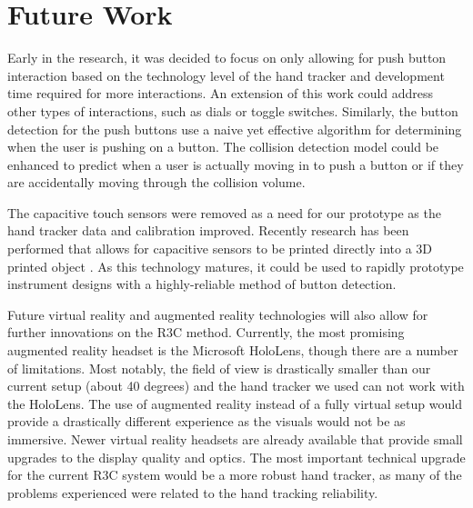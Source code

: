 \section{Future Work}

Early in the research, it was decided to focus on only allowing for push button interaction based on the technology level of the hand tracker and development time required for more interactions.
An extension of this work could address other types of interactions, such as dials or toggle switches.
Similarly, the button detection for the push buttons use a naive yet effective algorithm for determining when the user is pushing on a button.
The collision detection model could be enhanced to predict when a user is actually moving in to push a button or if they are accidentally moving through the collision volume.

The capacitive touch sensors were removed as a need for our prototype as the hand tracker data and calibration improved.
Recently research has been performed that allows for capacitive sensors to be printed directly into a 3D printed object \citep{shemelya_3d_2013,kwok_electrically_2017}.
As this technology matures, it could be used to rapidly prototype instrument designs with a highly-reliable method of button detection.

Future virtual reality and augmented reality technologies will also allow for further innovations on the R3C method.
Currently, the most promising augmented reality headset is the Microsoft HoloLens, though there are a number of limitations.
Most notably, the field of view is drastically smaller than our current setup (about 40 degrees) and the hand tracker we used can not work with the HoloLens.
The use of augmented reality instead of a fully virtual setup would provide a drastically different experience as the visuals would not be as immersive.
Newer virtual reality headsets are already available that provide small upgrades to the display quality and optics.
The most important technical upgrade for the current R3C system would be a more robust hand tracker, as many of the problems experienced were related to the hand tracking reliability.

